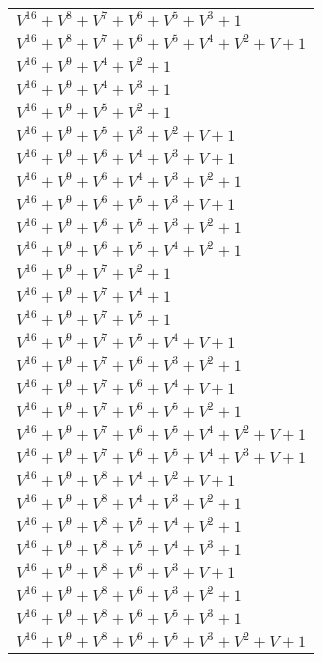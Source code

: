 \documentclass[12pt]{article}
\begin{document}
\begin{adjustwidth}{-4cm}{}
\begin{center}
\begin{longtable}{|l|}
$V^{16}  +V^{8}  +V^{7}  +V^{6}  +V^{5}  +V^{3}  + 1$ \\
$V^{16}  +V^{8}  +V^{7}  +V^{6}  +V^{5}  +V^{4}  +V^{2}  + V + 1$ \\
$V^{16}  +V^{9}  +V^{4}  +V^{2}  + 1$ \\
$V^{16}  +V^{9}  +V^{4}  +V^{3}  + 1$ \\
$V^{16}  +V^{9}  +V^{5}  +V^{2}  + 1$ \\
$V^{16}  +V^{9}  +V^{5}  +V^{3}  +V^{2}  + V + 1$ \\
$V^{16}  +V^{9}  +V^{6}  +V^{4}  +V^{3}  + V + 1$ \\
$V^{16}  +V^{9}  +V^{6}  +V^{4}  +V^{3}  +V^{2}  + 1$ \\
$V^{16}  +V^{9}  +V^{6}  +V^{5}  +V^{3}  + V + 1$ \\
$V^{16}  +V^{9}  +V^{6}  +V^{5}  +V^{3}  +V^{2}  + 1$ \\
$V^{16}  +V^{9}  +V^{6}  +V^{5}  +V^{4}  +V^{2}  + 1$ \\
$V^{16}  +V^{9}  +V^{7}  +V^{2}  + 1$ \\
$V^{16}  +V^{9}  +V^{7}  +V^{4}  + 1$ \\
$V^{16}  +V^{9}  +V^{7}  +V^{5}  + 1$ \\
$V^{16}  +V^{9}  +V^{7}  +V^{5}  +V^{4}  + V + 1$ \\
$V^{16}  +V^{9}  +V^{7}  +V^{6}  +V^{3}  +V^{2}  + 1$ \\
$V^{16}  +V^{9}  +V^{7}  +V^{6}  +V^{4}  + V + 1$ \\
$V^{16}  +V^{9}  +V^{7}  +V^{6}  +V^{5}  +V^{2}  + 1$ \\
$V^{16}  +V^{9}  +V^{7}  +V^{6}  +V^{5}  +V^{4}  +V^{2}  + V + 1$ \\
$V^{16}  +V^{9}  +V^{7}  +V^{6}  +V^{5}  +V^{4}  +V^{3}  + V + 1$ \\
$V^{16}  +V^{9}  +V^{8}  +V^{4}  +V^{2}  + V + 1$ \\
$V^{16}  +V^{9}  +V^{8}  +V^{4}  +V^{3}  +V^{2}  + 1$ \\
$V^{16}  +V^{9}  +V^{8}  +V^{5}  +V^{4}  +V^{2}  + 1$ \\
$V^{16}  +V^{9}  +V^{8}  +V^{5}  +V^{4}  +V^{3}  + 1$ \\
$V^{16}  +V^{9}  +V^{8}  +V^{6}  +V^{3}  + V + 1$ \\
$V^{16}  +V^{9}  +V^{8}  +V^{6}  +V^{3}  +V^{2}  + 1$ \\
$V^{16}  +V^{9}  +V^{8}  +V^{6}  +V^{5}  +V^{3}  + 1$ \\
$V^{16}  +V^{9}  +V^{8}  +V^{6}  +V^{5}  +V^{3}  +V^{2}  + V + 1$ \\

\end{longtable}
\end{center}
\end{adjustwidth}
\end{document}

